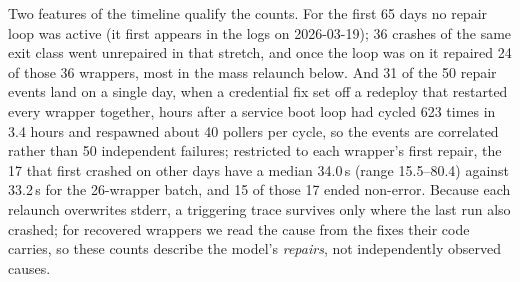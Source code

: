\documentclass[conference]{IEEEtran}
\begin{document}
Two features of the timeline qualify the counts. For the first 65 days no repair
loop was active (it first appears in the logs on 2026-03-19); 36 crashes of the same
exit class went unrepaired in that stretch, and once the loop was on it repaired 24 of
those 36 wrappers, most in the mass relaunch below. And 31 of the 50 repair events land on a single day, when a credential fix set off a
redeploy that restarted every wrapper together, hours after a service boot loop had
cycled 623 times in 3.4 hours and respawned about 40 pollers per cycle, so the
events are correlated rather than 50 independent failures;
restricted to each wrapper's first repair, the 17 that first crashed on other days
have a median 34.0\,s (range 15.5--80.4) against 33.2\,s for the 26-wrapper batch,
and 15 of those 17 ended non-error. Because each relaunch overwrites stderr, a triggering trace
survives only where the last run also crashed; for recovered wrappers we read the
cause from the fixes their code carries, so these counts describe the model's
\emph{repairs}, not independently observed causes.
\end{document}
